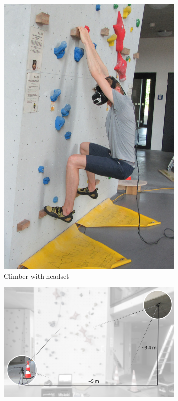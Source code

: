 \begin{figure}[ht]
    \centering
    \begin{subfigure}[t]{0.289\textwidth}
        \centering
        \includegraphics[width=\textwidth]{include/images/vive-setup-problem.jpg}
        \caption{Climber with headset}
        \label{fig:vive-setup-problem}
    \end{subfigure}
    \hfill
    \begin{subfigure}[t]{0.699\textwidth}  
        \centering 
        \includegraphics[width=\textwidth]{include/images/vive-setup-solution.jpg}

\end{subfigure}
\end{figure}
